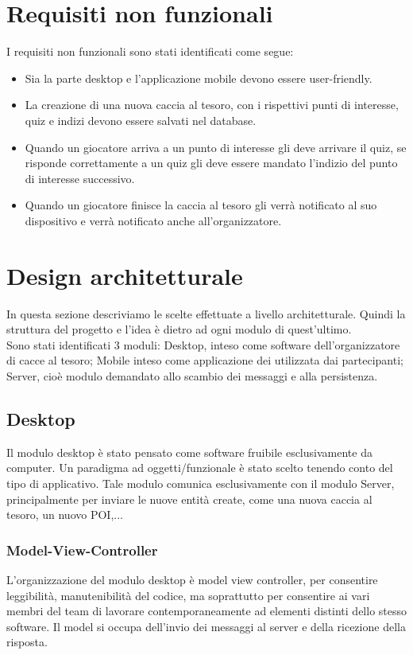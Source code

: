 \documentclass[12pt, italian]{article}
\begin{document}
\section{Requisiti non funzionali}
I requisiti non funzionali sono stati identificati come segue:
\begin{itemize}
	\item Sia la parte desktop e l'applicazione mobile devono essere user-friendly.
	\item La creazione di una nuova caccia al tesoro, con i rispettivi punti di interesse, quiz e indizi devono essere salvati nel database.
	\item Quando un giocatore arriva a un punto di interesse gli deve arrivare il quiz, se risponde correttamente a un quiz gli deve essere mandato l'indizio del punto di interesse successivo.
	\item Quando un giocatore finisce la caccia al tesoro gli verrà notificato al suo dispositivo e verrà notificato anche all'organizzatore.
\end{itemize}


\section{Design architetturale}
In questa sezione descriviamo le scelte effettuate a livello architetturale. Quindi la struttura del progetto e l'idea è dietro ad ogni modulo di quest'ultimo.\\
Sono stati identificati 3 moduli: Desktop, inteso come software dell'organizzatore di cacce al tesoro; Mobile inteso come applicazione dei utilizzata dai partecipanti; Server, cioè modulo demandato allo scambio dei messaggi e alla persistenza.

\subsection{Desktop}
Il modulo desktop è stato pensato come software fruibile esclusivamente da computer. Un paradigma ad oggetti/funzionale è stato scelto tenendo conto del tipo di applicativo. Tale modulo  comunica esclusivamente con il modulo Server, principalmente per inviare le nuove entità create, come una nuova caccia al tesoro, un nuovo POI,...
\subsubsection{Model-View-Controller}
L'organizzazione del modulo desktop è model view controller, per consentire leggibilità, manutenibilità del codice, ma soprattutto per consentire ai vari membri del team di lavorare contemporaneamente ad elementi distinti dello stesso software.
Il model si occupa dell'invio dei messaggi al server e della ricezione della risposta.
\end{document}
